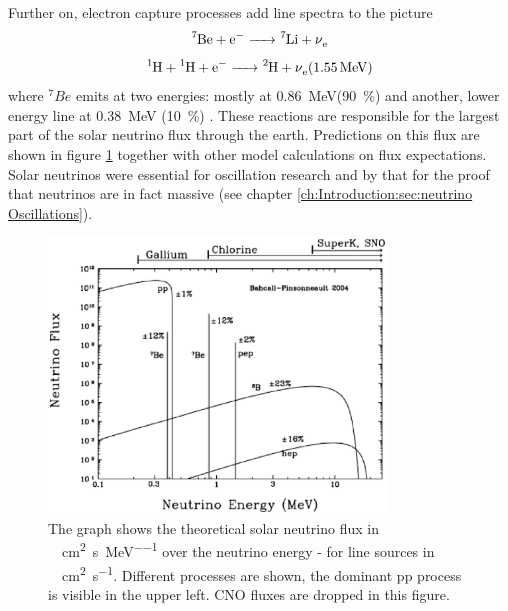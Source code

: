 \begin{itemize}
		Further on, electron capture processes add line spectra to the picture
		\begin{equation}
			\ce{^7Be + e- -> ^7Li + \nu_e}
			\label{eq:Berillium}
		\end{equation}
		\begin{equation}
			\ce{^1H + ^1H + e- -> ^2H + \nu_e} (\SI{1.55}{\mega\electronvolt})
		\end{equation}
		where $^7Be$ emits at two energies: mostly at \SI{0.86}{\mega\electronvolt}(\SI{90}{\percent}) and another, lower energy line at \SI{0.38}{\mega\electronvolt} (\SI{10}{\percent}) \cite{bethgeKernphysik}.
		These reactions are responsible for the largest part of the solar neutrino flux through the earth. Predictions on this flux are shown in figure \ref{fig:neutrinos:solarNeutrinos} together with other model calculations on flux expectations.
		Solar neutrinos were essential for oscillation research and by that for the proof that neutrinos are in fact massive (see chapter \ref{ch:Introduction:sec:neutrino Oscillations}).
		\begin{figure}
		\centering
			\includegraphics[width=0.8\textwidth]{graphics/neutrinos/solarNeutrinos.eps}
			\caption[Solar neutrino Flux]{The graph shows the theoretical solar neutrino flux in \SI{}{\per\square\centi\meter \per\second \per\mega\electronvolt} over the neutrino energy - for line sources in \SI{}{\per\square\centi\meter \per\second}. Different processes are shown, the dominant pp process is visible in the upper left. CNO fluxes are dropped in this figure.}
			\label{fig:neutrinos:solarNeutrinos}
		\end{figure}


\end{itemize}
